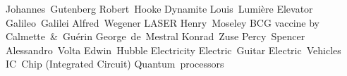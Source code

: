 \answerkey
{} Johannes Gutenberg
 Robert Hooke
 Dynamite
 Louis Lumière
 Elevator
 Galileo Galilei
 Alfred Wegener
 LASER
 Henry Moseley
 BCG vaccine by Calmette & Guérin
 George de Mestral
 Konrad Zuse
 Percy Spencer
 Alessandro Volta
 Edwin Hubble
 Electricity
 Electric Guitar
 Electric Vehicles
 IC Chip (Integrated Circuit)
 Quantum processors
\endanswerkey